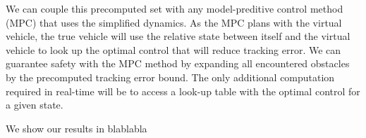 We can couple this precomputed set with any model-preditive control method (MPC) that uses the simplified dynamics. As the MPC plans with the virtual vehicle, the true vehicle will use the relative state between itself and the virtual vehicle to look up the optimal control that will reduce tracking error. We can guarantee safety with the MPC method by expanding all encountered obstacles by the precomputed tracking error bound. The only additional computation required in real-time will be to access a look-up table with the optimal control for a given state.

We show our results in blablabla